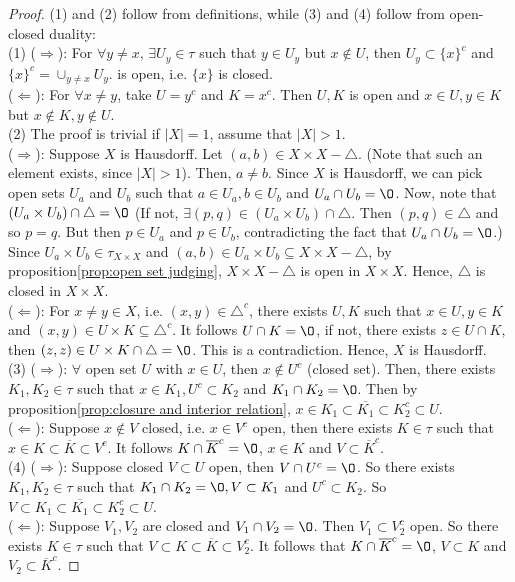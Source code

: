 \begin{proof}
    (1) and (2) follow from definitions, while (3) and (4)
follow from open-closed duality:\\
(1) ($\Rightarrow$): For $\forall y\neq x$, $\exists U_y\in \tau$ such that $y\in U_y$ but $x\notin U$, then $U_y\subset \{x\}^c$ 
    and $\{x\}^c=\cup_{y\neq x}U_y$.
    is open, i.e. $\{x\}$ is closed. \\
    ($\Leftarrow$): For $\forall x\neq y$, take $U={y}^c$ and $K={x}^c$. Then $U,K$ is open and $x\in U, y\in K$ but $x\notin K, y\notin U$.\\
(2) The proof is trivial if $|X|=1$, assume that $|X|>1$.\\
    ($\Rightarrow$): 
    Suppose $X$ is Hausdorff. Let $(a,b)\in X\times X-\triangle$. 
    (Note that such an element exists, since $|X|>1$). Then, $a\neq b$.
    Since $X$ is Hausdorff, we can pick open sets $U_a$ and $U_b$ such that $a\in U_a,b\in U_b$ and $U_a\cap U_b=\O$.
    Now, note that $(U_a\times U_b)\cap \triangle = \O$ (If not, $\exists (p,q)\in (U_a\times U_b)\cap \triangle$. 
    Then $(p,q)\in \triangle$ and so $p=q$. But then $p\in U_a$ and $p\in U_b$, contradicting the fact that $U_a\cap U_b=\O$.)
    Since $U_a\times U_b\in \tau_{X\times X}$ and $(a,b)\in U_a\times U_b\subseteq X\times X-\triangle$, 
    by proposition\ref{prop:open set judging}, $X\times X-\triangle$ is open in $X\times X$. 
    Hence, $\triangle$ is closed in $X\times X$.\\
    ($\Leftarrow$): For $x\neq y\in X$, i.e. $(x,y)\in \triangle^c$, there exists $U,K$ such that $x\in U,y\in K$ and
    $(x,y)\in U\times K\subseteq \triangle^c$. 
    It follows $U\cap K=\O$, if not, there exists $z\in U\cap K$, 
    then $(z,z)\in U\times K\cap\triangle=\O$. This is a contradiction. 
    Hence, $X$ is Hausdorff.\\
(3) ($\Rightarrow$):
    $\forall$ open set $U$ with $x\in U$, then $x\notin U^c$ (closed set).
    Then, there exists $K_1,K_2\in \tau$ such that $x\in K_1, U^c\subset K_2$ and $K_1\cap K_2=\O$.
    Then by proposition\ref{prop:closure and interior relation}, $x\in K_1\subset \overline{K_1}\subset K_2^c\subset U$.\\
    ($\Leftarrow$):
    Suppose $x\notin V$ closed, i.e. $x\in V^c$ open, then there exists $K\in \tau$ such that 
    $x\in K\subset \overline{K}\subset V^c$. It follows $K\cap \overline{K}^c=\O$, $x\in K$ and $V\subset \overline{K}^c$.\\
(4) ($\Rightarrow$):
    Suppose closed $V\subset U$ open, then $V\cap U^c=\O$.
    So there exists $K_1,K_2\in\tau$ such that $K_1\cap K_2=\O, V\subset K_1$ and $U^c\subset K_2$.
    So $V\subset K_1\subset \overline{K_1}\subset K_2^c\subset U$.\\
    ($\Leftarrow$):
    Suppose $V_1,V_2$ are closed and $V_1\cap V_2=\O$. Then $V_1\subset V_2^c$ open. 
    So there exists $K\in \tau$ such that $V\subset K\subset \overline{K}\subset V_2^c$.
    It follows that $K\cap \overline{K}^c=\O$, $V\subset K$ and $V_2\subset \overline{K}^c$. 
\end{proof}


